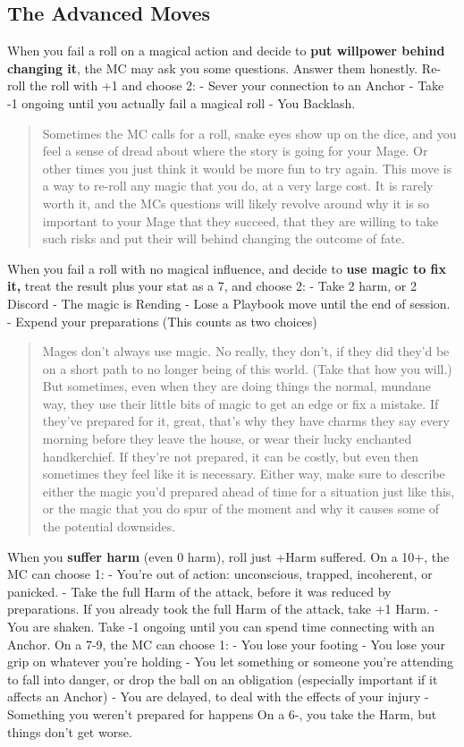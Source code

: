 \documentclass[
]{article}
\begin{document}
\hypertarget{the-advanced-moves}{%
\subsection{The Advanced Moves}\label{the-advanced-moves}}

When you fail a roll on a magical action and decide to \textbf{put
willpower behind changing it}, the MC may ask you some questions. Answer
them honestly. Re-roll the roll with +1 and choose 2: - Sever your
connection to an Anchor - Take -1 ongoing until you actually fail a
magical roll - You Backlash.

\begin{quote}
Sometimes the MC calls for a roll, snake eyes show up on the dice, and
you feel a sense of dread about where the story is going for your Mage.
Or other times you just think it would be more fun to try again. This
move is a way to re-roll any magic that you do, at a very large cost. It
is rarely worth it, and the MCs questions will likely revolve around why
it is so important to your Mage that they succeed, that they are willing
to take such risks and put their will behind changing the outcome of
fate.
\end{quote}

When you fail a roll with no magical influence, and decide to
\textbf{use magic to fix it,} treat the result plus your stat as a 7,
and choose 2: - Take 2 harm, or 2 Discord - The magic is Rending - Lose
a Playbook move until the end of session. - Expend your preparations
(This counts as two choices)

\begin{quote}
Mages don't always use magic. No really, they don't, if they did they'd
be on a short path to no longer being of this world. (Take that how you
will.) But sometimes, even when they are doing things the normal,
mundane way, they use their little bits of magic to get an edge or fix a
mistake. If they've prepared for it, great, that's why they have charms
they say every morning before they leave the house, or wear their lucky
enchanted handkerchief. If they're not prepared, it can be costly, but
even then sometimes they feel like it is necessary. Either way, make
sure to describe either the magic you'd prepared ahead of time for a
situation just like this, or the magic that you do spur of the moment
and why it causes some of the potential downsides.
\end{quote}

When you \textbf{suffer harm} (even 0 harm), roll just +Harm suffered.
On a 10+, the MC can choose 1: - You're out of action: unconscious,
trapped, incoherent, or panicked. - Take the full Harm of the attack,
before it was reduced by preparations. If you already took the full Harm
of the attack, take +1 Harm. - You are shaken. Take -1 ongoing until you
can spend time connecting with an Anchor. On a 7-9, the MC can choose 1:
- You lose your footing - You lose your grip on whatever you're holding
- You let something or someone you're attending to fall into danger, or
drop the ball on an obligation (especially important if it affects an
Anchor) - You are delayed, to deal with the effects of your injury -
Something you weren't prepared for happens On a 6-, you take the Harm,
but things don't get worse.
\end{document}

